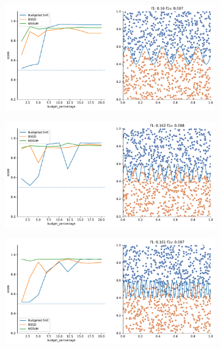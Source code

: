 \begin{figure}
\begin{subfigure}{.5\textwidth}
    \end{subfigure}
    \begin{subfigure}{.5\textwidth}
        \centering
        \includegraphics[width=\textwidth]{img/comp_new/12.pdf}
    \end{subfigure}%
    \hfill
    \begin{subfigure}{.5\textwidth}
        \centering
        \includegraphics[width=\textwidth]{img/comp_new/13.pdf}
    \end{subfigure}
    \begin{subfigure}{.5\textwidth}
        \centering
        \includegraphics[width=\textwidth]{img/comp_new/14.pdf}

\end{subfigure}
\end{figure}
